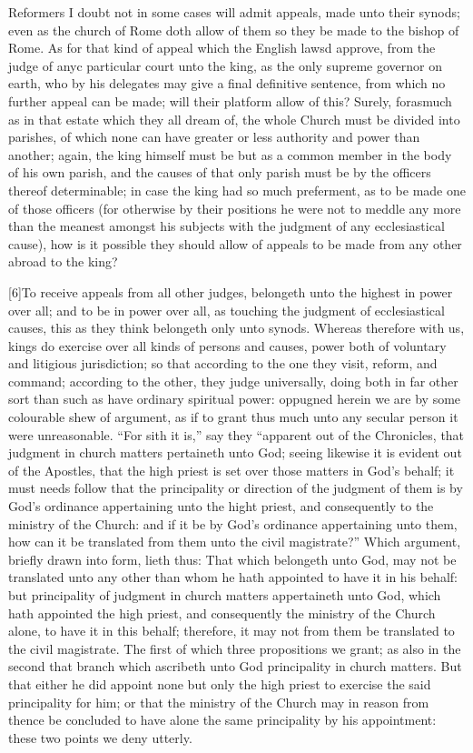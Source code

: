 Reformers I doubt not in some cases will admit appeals, made unto their synods; even as the church of Rome doth allow of them so they be made to the bishop of Rome. As for that kind of appeal which the English lawsd approve, from the judge of anyc particular court unto the king, as the only supreme governor on earth, who by his delegates may give a final definitive sentence, from which no further appeal can be made; will their platform allow of this? Surely, forasmuch as in that estate which they all dream of, the whole Church must be divided into parishes, of which none can have greater or less authority and power than another; again, the king himself must be but as a common member in the body of his own parish, and the causes of that only parish must be by the officers thereof determinable; in case the king had so much preferment, as to be made one of those officers (for otherwise by their positions he were not to meddle any more than the meanest amongst his subjects with the judgment of any ecclesiastical cause), how is it possible they should allow of appeals to be made from any other abroad to the king?

[6]To receive appeals from all other judges, belongeth unto the highest in power over all; and to be in power over all, as touching the judgment of ecclesiastical causes, this  as they think belongeth only unto synods. Whereas therefore with us, kings do exercise over all kinds of persons and causes, power both of voluntary and litigious jurisdiction; so that according to the one they visit, reform, and command; according to the other, they judge universally, doing both in far other sort than such as have ordinary spiritual power: oppugned herein we are by some colourable shew of argument, as if to grant thus much unto any secular person it were unreasonable. “For sith it is,” say they “apparent out of the Chronicles, that judgment in church matters pertaineth unto God; seeing likewise it is evident out of the Apostles, that the high priest is set over those matters in God’s behalf; it must needs follow that the principality or direction of the judgment of them is by God’s ordinance appertaining unto the hight priest, and consequently to the ministry of the Church: and if it be by God’s ordinance appertaining unto them, how can it be translated from them unto the civil magistrate?” Which argument, briefly drawn into form, lieth thus: That which belongeth unto God, may not be translated unto any other than whom he hath appointed to have it in his behalf: but principality of judgment in church matters appertaineth unto God, which hath appointed the high priest, and consequently the ministry of the Church alone, to have it in this behalf; therefore, it may not from them be translated to the civil magistrate. The first of which three propositions we grant; as also in the second that branch which ascribeth unto God principality in church matters. But that either he did appoint none but only the high priest to exercise the said principality for him; or that the ministry of the Church may in reason from thence be concluded to have alone the same principality by his appointment: these two points we deny utterly.


